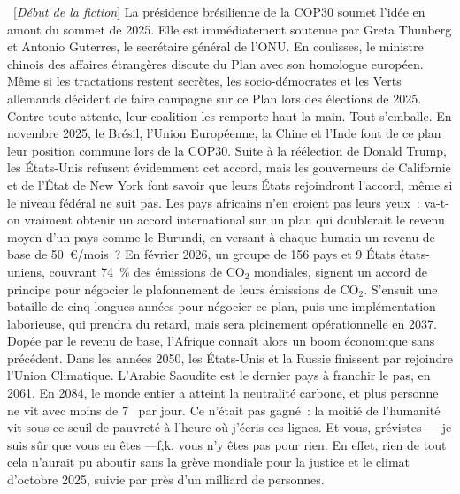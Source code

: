 \documentclass[a5paper,french,openany]{memoir}
\begin{document}
~[\textit{Début de la fiction}] La présidence brésilienne de la COP30 soumet l'idée en amont du sommet de 2025. Elle est immédiatement soutenue par Greta Thunberg et Antonio Guterres, le secrétaire général de l'ONU. 
En coulisses, le ministre chinois des affaires étrangères discute du Plan avec son homologue européen.  
Même si les tractations restent secrètes, les socio-démocrates et les Verts allemands décident de faire campagne sur ce Plan lors des élections de 2025. 
Contre toute attente, leur coalition les remporte haut la main. 
Tout s'emballe. En novembre 2025, le Brésil, l'Union Européenne, la Chine et l'Inde font de ce plan leur position commune lors de la COP30. Suite à la réélection de Donald Trump, les États-Unis refusent évidemment cet accord, mais les gouverneurs de Californie et de l'État de New York font savoir que leurs États rejoindront l'accord, même si le niveau fédéral ne suit pas. Les pays africains n'en croient pas leurs yeux~: 
va-t-on vraiment obtenir un accord international %
sur un plan qui doublerait le revenu moyen d'un pays comme le Burundi, en versant à chaque humain un revenu de base de 50~\euro{}/mois~? En février 2026, un groupe de 156 pays et 9 États états-uniens, couvrant 74~\% des émissions de CO$_\text{2}$ mondiales, signent un accord de principe pour négocier le plafonnement de leurs émissions de CO$_\text{2}$. S'ensuit une bataille de cinq longues années pour négocier ce plan, puis une implémentation laborieuse, qui prendra du retard, mais sera pleinement opérationnelle en 2037. Dopée par le revenu de base, l'Afrique connaît alors un boom économique sans précédent. Dans les années 2050, les États-Unis et la Russie finissent par rejoindre l'Union Climatique. L'Arabie Saoudite est le dernier pays à franchir le pas, en 2061. En 2084, le monde entier a atteint la neutralité carbone, et plus personne ne vit avec moins de 7~\textit{\texteuro{}} par jour. Ce n'était pas gagné~: la moitié de l'humanité vit sous ce seuil de pauvreté à l'heure où j'écris ces lignes. %
Et vous, grévistes --- je suis sûr que vous en êtes ---f;k, vous n'y êtes pas pour rien. En effet, rien de tout cela n'aurait pu aboutir sans la grève mondiale pour la justice et le climat d'octobre 2025, suivie par près d'un milliard de personnes.
\end{document}

